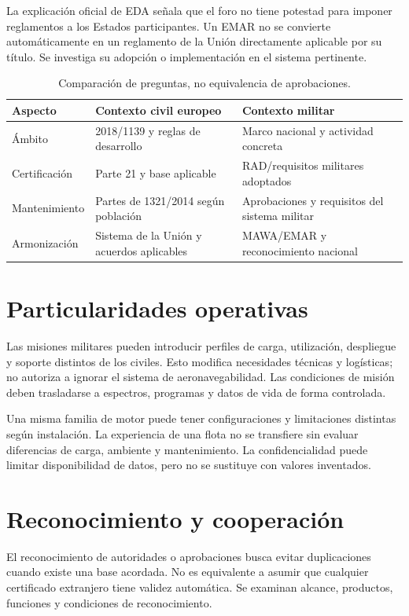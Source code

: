 La explicación oficial de EDA señala que el foro no tiene potestad para imponer reglamentos a los Estados participantes. Un EMAR no se convierte automáticamente en un reglamento de la Unión directamente aplicable por su título. Se investiga su adopción o implementación en el sistema pertinente.
\begin{table}[htbp]\centering\small\caption{Comparación de preguntas, no equivalencia de aprobaciones.}\label{tab:militar}
\begin{tabular}{p{.26\linewidth}p{.3\linewidth}p{.31\linewidth}}\toprule
Aspecto & Contexto civil europeo & Contexto militar\\\midrule
Ámbito & 2018/1139 y reglas de desarrollo & Marco nacional y actividad concreta\\[4pt]
Certificación & Parte 21 y base aplicable & RAD/requisitos militares adoptados\\[4pt]
Mantenimiento & Partes de 1321/2014 según población & Aprobaciones y requisitos del sistema militar\\[4pt]
Armonización & Sistema de la Unión y acuerdos aplicables & MAWA/EMAR y reconocimiento nacional\\\bottomrule
\end{tabular}\end{table}
\section{Particularidades operativas}
Las misiones militares pueden introducir perfiles de carga, utilización, despliegue y soporte distintos de los civiles. Esto modifica necesidades técnicas y logísticas; no autoriza a ignorar el sistema de aeronavegabilidad. Las condiciones de misión deben trasladarse a espectros, programas y datos de vida de forma controlada.

Una misma familia de motor puede tener configuraciones y limitaciones distintas según instalación. La experiencia de una flota no se transfiere sin evaluar diferencias de carga, ambiente y mantenimiento. La confidencialidad puede limitar disponibilidad de datos, pero no se sustituye con valores inventados.
\section{Reconocimiento y cooperación}
El reconocimiento de autoridades o aprobaciones busca evitar duplicaciones cuando existe una base acordada. No es equivalente a asumir que cualquier certificado extranjero tiene validez automática. Se examinan alcance, productos, funciones y condiciones de reconocimiento.

